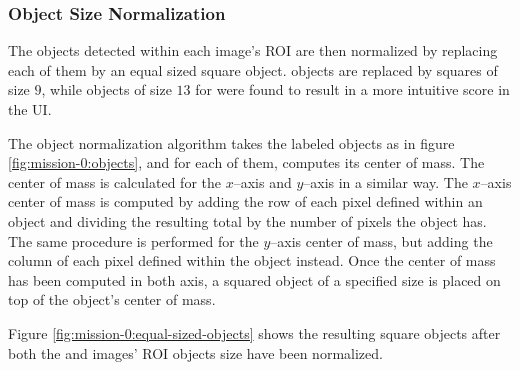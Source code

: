 \subsubsection{Object Size Normalization} \label{subsubsect:case-study:impl:object-normalization}
The objects detected within each image's ROI are then normalized by replacing each of them by an equal sized square object. \usno objects are replaced by squares of size $9$, while objects of size $13$ for \panstarrs were found to result in a more intuitive score in the UI.  \newline

The object normalization algorithm takes the labeled objects as in figure \ref{fig:mission-0:objects}, and for each of them, computes its center of mass. The center of mass is calculated for the $x$--axis and $y$--axis in a similar way. The $x$--axis center of mass is computed by adding the row of each pixel defined within an object and dividing the resulting total by the number of pixels the object has. The same procedure is performed for the $y$--axis center of mass, but adding the column of each pixel defined within the object instead. Once the center of mass has been computed in both axis, a squared object of a specified size is placed on top of the object's center of mass. \newline

Figure \ref{fig:mission-0:equal-sized-objects} shows the resulting square objects after both the \usno and \panstarrs images' ROI objects size have been normalized.

